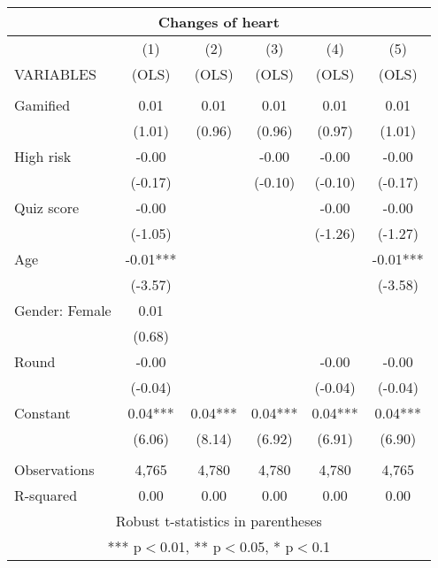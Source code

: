 \documentclass[]{article}
\begin{document}
\begin{tabular}{lccccc}
\multicolumn{6}{c}{Changes of heart} \\ \hline
 & (1) & (2) & (3) & (4) & (5) \\
VARIABLES & (OLS) & (OLS) & (OLS) & (OLS) & (OLS) \\ \hline
 &  &  &  &  &  \\
Gamified & 0.01 & 0.01 & 0.01 & 0.01 & 0.01 \\
 & (1.01) & (0.96) & (0.96) & (0.97) & (1.01) \\
High risk & -0.00 &  & -0.00 & -0.00 & -0.00 \\
 & (-0.17) &  & (-0.10) & (-0.10) & (-0.17) \\
Quiz score & -0.00 &  &  & -0.00 & -0.00 \\
 & (-1.05) &  &  & (-1.26) & (-1.27) \\
Age & -0.01*** &  &  &  & -0.01*** \\
 & (-3.57) &  &  &  & (-3.58) \\
Gender: Female & 0.01 &  &  &  &  \\
 & (0.68) &  &  &  &  \\
Round & -0.00 &  &  & -0.00 & -0.00 \\
 & (-0.04) &  &  & (-0.04) & (-0.04) \\
Constant & 0.04*** & 0.04*** & 0.04*** & 0.04*** & 0.04*** \\
 & (6.06) & (8.14) & (6.92) & (6.91) & (6.90) \\
 &  &  &  &  &  \\
Observations & 4,765 & 4,780 & 4,780 & 4,780 & 4,765 \\
 R-squared & 0.00 & 0.00 & 0.00 & 0.00 & 0.00 \\ \hline
\multicolumn{6}{c}{ Robust t-statistics in parentheses} \\
\multicolumn{6}{c}{ *** p$<$0.01, ** p$<$0.05, * p$<$0.1} \\
\end{tabular}
\end{document}
